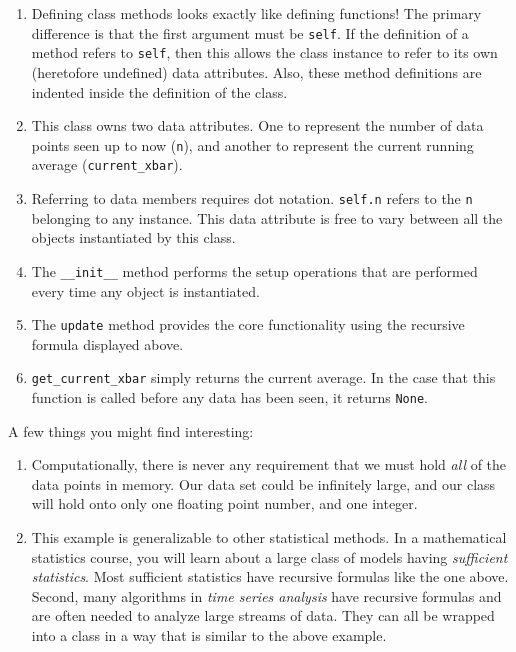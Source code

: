 \documentclass[12pt,krantz2]{krantz}
\begin{document}
\begin{enumerate}
\def\labelenumi{\arabic{enumi}.}
\item
  Defining class methods looks exactly like defining functions! The primary difference is that the first argument must be \texttt{self}. If the definition of a method refers to \texttt{self}, then this allows the class instance to refer to its own (heretofore undefined) data attributes. Also, these method definitions are indented inside the definition of the class.
\item
  This class owns two data attributes. One to represent the number of data points seen up to now (\texttt{n}), and another to represent the current running average (\texttt{current\_xbar}).
\item
  Referring to data members requires dot notation. \texttt{self.n} refers to the \texttt{n} belonging to any instance. This data attribute is free to vary between all the objects instantiated by this class.
\item
  The \texttt{\_\_init\_\_} method performs the setup operations that are performed every time any object is instantiated.
\item
  The \texttt{update} method provides the core functionality using the recursive formula displayed above.
\item
  \texttt{get\_current\_xbar} simply returns the current average. In the case that this function is called before any data has been seen, it returns \texttt{None}.
\end{enumerate}

A few things you might find interesting:

\begin{enumerate}
\def\labelenumi{\roman{enumi}.}
\item
  Computationally, there is never any requirement that we must hold \emph{all} of the data points in memory. Our data set could be infinitely large, and our class will hold onto only one floating point number, and one integer.
\item
  This example is generalizable to other statistical methods. In a mathematical statistics course, you will learn about a large class of models having \emph{sufficient statistics}. Most sufficient statistics have recursive formulas like the one above. Second, many algorithms in \emph{time series analysis} have recursive formulas and are often needed to analyze large streams of data. They can all be wrapped into a class in a way that is similar to the above example.
\end{enumerate}
\end{document}
